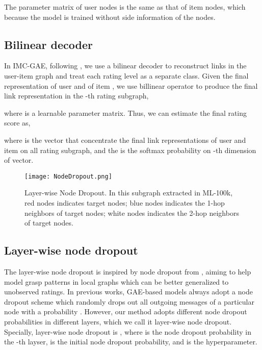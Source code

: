 \documentclass[sigconf]{acmart}
\begin{document}
The parameter matrix  of user nodes is the same as that of item nodes, which because the model is trained without side information of the nodes.
\subsection{Bilinear decoder}
In IMC-GAE, following \cite{berg2017graph}, we use a bilinear decoder to reconstruct links in the user-item graph and treat each rating level as a separate class. Given the final representation  of user  and  of item , we use billinear operator to produce the final link representation  in the -th rating subgraph,

where  is a learnable parameter matrix. Thus, we can estimate the final rating score as,

where  is the vector that concentrate the final link representations of user  and item  on all  rating subgraph, and the  is the softmax probability on -th dimension of  vector. 
\begin{figure}[tp]
    \centering\texttt{[image: NodeDropout.png]}
    \caption{Layer-wise Node Dropout. In this subgraph extracted in ML-100k, red nodes indicates target nodes; blue nodes indicates the 1-hop neighbors of target nodes; white nodes indicates the 2-hop neighbors of target nodes.}
    \label{fig:NodeDropout}
\end{figure}
\subsection{Layer-wise node dropout}
\label{sub_sec_3}
The layer-wise node dropout is inspired by node dropout from \cite{berg2017graph}, aiming to help model grasp patterns in local graphs which can be better generalized to unobserved ratings.
In previous works, GAE-based models always adopt a node dropout scheme which randomly drops out all outgoing messages of a particular node with a probability . However, our method adopts different node dropout probabilities in different layers, which we call it layer-wise node dropout. Specially, layer-wise node dropout is ,
where  is the node dropout probability in the -th layser,  is the initial node dropout probability, and  is the hyperparameter. 
\end{document}
